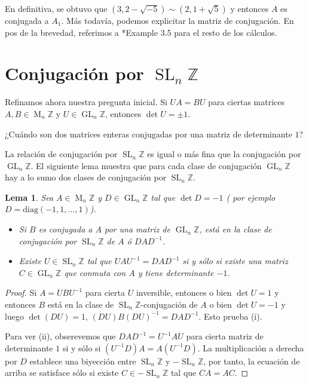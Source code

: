 \documentclass[11pt,a4paper]{amsart}
\newcommand{\Z}{\mathbb{Z}}
\DeclareMathOperator{\M}{M}
\DeclareMathOperator{\GL}{GL}
\DeclareMathOperator{\SL}{SL}
\numberwithin{equation}{section}
\theoremstyle{plain}
\newtheorem{lem}[equation]{Lema}
\begin{document}
En definitiva, se obtuvo que $(3,2-\sqrt{-5}) \sim (2,1+\sqrt{5})$
y entonces $A$ es conjugada a $A_1$. Más todavía, podemos
explicitar la matriz de conjugación. En pos de la brevedad,
referimos a \cite{KCd}*{Example 3.5} para el resto de los cálculos.

\section{Conjugación por $\SL_n \Z$}

Refinamos ahora nuestra pregunta inicial. Si $UA = BU$
para ciertas matrices $A,B \in \M_n \Z$ y $U \in \GL_n \Z$,
entonces $\det U = \pm 1$.

\begin{tcolorbox}[colback=thmcol!30, sharp corners, colframe=white]
¿Cuándo son dos matrices enteras
conjugadas por una matriz de determinante $1$?
\end{tcolorbox}

La relación de conjugación por $\SL_n \Z$
es igual o más fina que la conjugación por $\GL_n \Z$.
El siguiente lema muestra que para cada clase de conjugación
$\GL_n \Z$ hay a lo sumo dos clases de conjugación por $\SL_n \Z$.

\begin{lem} Sea $A \in \M_n \Z$ y $D \in \GL_n \Z$ tal que $\det D = -1$ (
por ejemplo $D=\mathrm{diag}(-1,1,\ldots,1)$).
\begin{itemize}
  \item[(i)] Si $B$ es conjugada a $A$ por una matriz de $\GL_n \Z$,
  está en la clase de conjugación por $\SL_n \Z$ de $A$ ó $DAD^{-1}$.
  \item[(ii)] Existe $U \in \SL_n \Z$ tal que $UAU^{-1} = DAD^{-1}$
  si y sólo si existe una matriz $C \in \GL_n \Z$ que conmuta con $A$ y tiene
  determinante $-1$.
\end{itemize}
\end{lem}
\begin{proof} Si $A = UBU^{-1}$ para cierta $U$ inversible, entonces
o bien $\det U = 1$ y entonces $B$ está en la clase de $\SL_n \Z$-conjugación
de $A$ o bien $\det U = -1$ y luego $\det(DU) = 1$,
$(DU)B(DU)^{-1} = DAD^{-1}$. Esto prueba (i).

Para ver (ii), obserevemos que $DAD^{-1} = U^{-1}AU$ para cierta matriz
de determinante $1$ si y sólo si $(U^{-1}D)A = A(U^{-1}D)$.
La multiplicación a derecha por $D$ establece una biyección entre
$\SL_n \Z$ y $-\SL_n \Z$, por tanto, la ecuación de arriba se satisface
sólo si existe $C \in -\SL_n \Z$ tal que $CA = AC$.
\end{proof}
\end{document}
